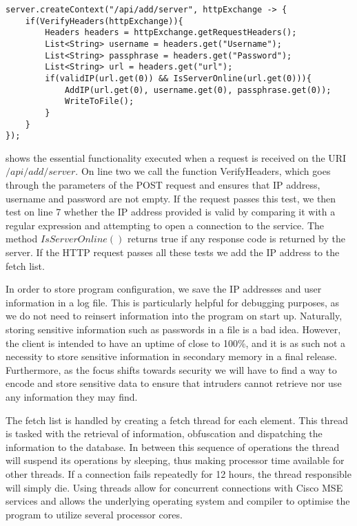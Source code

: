 \begin{lstlisting}[caption={Adding a server to the fetch list},label={lst:add_server},language=inc_Java, mathescape]
server.createContext("/api/add/server", httpExchange -> {
    if(VerifyHeaders(httpExchange)){
        Headers headers = httpExchange.getRequestHeaders();
        List<String> username = headers.get("Username");
        List<String> passphrase = headers.get("Password");
        List<String> url = headers.get("url");
        if(validIP(url.get(0)) && IsServerOnline(url.get(0))){
            AddIP(url.get(0), username.get(0), passphrase.get(0));
            WriteToFile();
        }
    }
});
\end{lstlisting}
 shows the essential functionality executed when a request is received on the URI $/api/add/server$. On line two we call the function VerifyHeaders, which goes through the parameters of the POST request and ensures that IP address, username and password are not empty. If the request passes this test, we then test on line 7 whether the IP address provided is valid by comparing it with a regular expression and attempting to open a connection to the service. The method $IsServerOnline()$ returns true if any response code is returned by the server. If the HTTP request passes all these tests we add the IP address to the fetch list.

In order to store program configuration, we save the IP addresses and user information in a log file. This is particularly helpful for debugging purposes, as we do not need to reinsert information into the program on start up. Naturally, storing sensitive information such as passwords in a file is a bad idea. However, the client is intended to have an uptime of close to 100\%, and it is as such not a necessity to store sensitive information in secondary memory in a final release. Furthermore, as the focus shifts towards security we will have to find a way to encode and store sensitive data to ensure that intruders cannot retrieve nor use any information they may find.

The fetch list is handled by creating a fetch thread for each element. This thread is tasked with the retrieval of information, obfuscation and dispatching the information to the database. In between this sequence of operations the thread will suspend its operations by sleeping, thus making processor time available for other threads. If a connection fails repeatedly for 12 hours, the thread responsible will simply die. Using threads allow for concurrent connections with Cisco MSE services and allows the underlying operating system and compiler to optimise the program to utilize several processor cores.